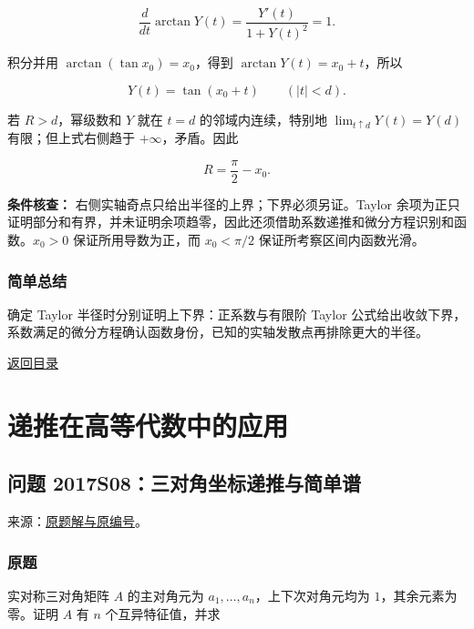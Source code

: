 \documentclass[11pt,a4paper]{article}
\begin{document}
\[
\frac d{dt}\arctan Y(t)=\frac{Y'(t)}{1+Y(t)^2}=1.
\]

积分并用 \(\arctan(\tan x_0)=x_0\)，得到 \(\arctan Y(t)=x_0+t\)，所以

\[
Y(t)=\tan(x_0+t)\qquad(|t|<d).
\]

若 \(R>d\)，幂级数和 \(Y\) 就在 \(t=d\) 的邻域内连续，特别地
\(\lim_{t\uparrow d}Y(t)=Y(d)\) 有限；但上式右侧趋于
\(+\infty\)，矛盾。因此

\[
\boxed{R=\frac\pi2-x_0}.
\]

\textbf{条件核查：} 右侧实轴奇点只给出半径的上界；下界必须另证。Taylor
余项为正只证明部分和有界，并未证明余项趋零，因此还须借助系数递推和微分方程识别和函数。\(x_0>0\)
保证所用导数为正，而 \(x_0<\pi/2\) 保证所考察区间内函数光滑。

\subsubsection{简单总结}\label{ux7b80ux5355ux603bux7ed3-28}

确定 Taylor 半径时分别证明上下界：正系数与有限阶 Taylor
公式给出收敛下界，系数满足的微分方程确认函数身份，已知的实轴发散点再排除更大的半径。

\noindent\hyperref[contents]{返回目录}

\clearpage

\section{递推在高等代数中的应用}\label{ux9012ux63a8ux5728ux9ad8ux7b49ux4ee3ux6570ux4e2dux7684ux5e94ux7528}

\subsection{问题
2017S08：三对角坐标递推与简单谱}\label{ux95eeux9898-2017s08ux4e09ux5bf9ux89d2ux5750ux6807ux9012ux63a8ux4e0eux7b80ux5355ux8c31}

来源：\href{https://zj139.github.io/math-notes/essays/39a692552e042a7b089919e3/\#问题-2017s08}{原题解与原编号}。

\subsubsection{原题}\label{ux539fux9898-29}

实对称三对角矩阵 \(A\) 的主对角元为 \(a_1,\ldots,a_n\)，上下次对角元均为
\(1\)，其余元素为零。证明 \(A\) 有 \(n\) 个互异特征值，并求
\end{document}
